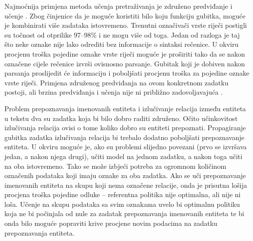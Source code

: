 Najmoćnija primjena metoda učenja pretraživanja je združeno predviđanje i učenje
. Zbog činjenice da je moguće koristiti bilo
koju funkciju gubitka, moguće je kombinirati više zadataka istovremeno. Trenutni
označivači vrste riječi postigli su točnost od otprilike 97--98\%
\citep{manning2011part} i ne mogu više od toga. Jedan od razloga je taj što neke
oznake nije lako odrediti bez informacije o sintaksi rečenice. U \lts{} okviru
procjenu troška pojedine oznake vrste riječi moguće je proširiti tako da se
nakon označene cijele rečenice izvrši ovisnosno parsanje. Gubitak koji je
dobiven nakon parsanja proslijedit će informaciju i poboljšati procjenu
troška za pojedine oznake vrste riječi. Primjena združenog predviđanja na ovom
konkretnom zadatku postoji, ali brzina predviđanja i učenja nije ni približno
zadovoljavajuća \citep{bohnet2012transition}.

Problem prepoznavanja imenovanih entiteta i izlučivanje relacija između entiteta
u tekstu dva su zadatka koja bi bilo dobro raditi združeno. Očito učinkovitost
izlučivanja relacija ovisi o tome koliko dobro su entiteti prepoznati.
Propagiranje gubitka zadatka izlučivanja relacija bi trebalo dodatno poboljšati
prepoznavanje entiteta. U \lts{} okviru moguće je, ako su problemi slijedno
povezani (prvo se izvršava jedan, a nakon njega drugi), učiti model na jednom
zadatku, a nakon toga učiti na oba istovremeno. Tako se može izbjeći potreba za
ogromnom količinom označenih podataka koji imaju oznake za oba zadatka. Ako se
uči prepoznavanje imenovanih entiteta na skupu koji nema označene relacije, onda
je prisutna lošija procjena troška pojedine odluke -- referentna politika nije
optimalna, ali nije ni loša. Učenje na skupu podataka sa svim oznakama uvelo bi
optimalnu politiku koja ne bi počinjala od nule za zadatak prepoznavanja
imenovanih entiteta te bi onda bilo moguće popraviti krive procjene novim
podacima na zadatku prepoznavanja entiteta.


